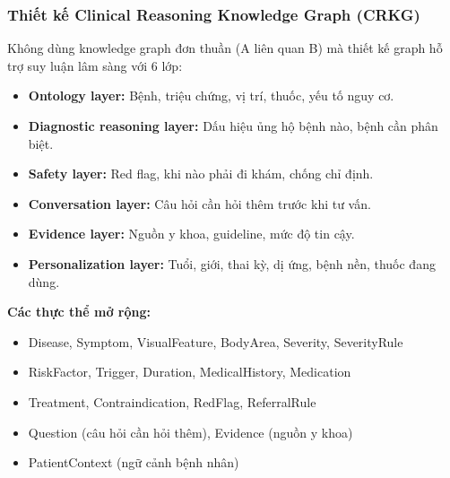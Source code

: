 \documentclass[12pt,a4paper]{article}
\begin{document}
\subsubsection{Thiết kế Clinical Reasoning Knowledge Graph (CRKG)}

Không dùng knowledge graph đơn thuần (A liên quan B) mà thiết kế graph hỗ trợ suy luận lâm sàng với 6 lớp:

\begin{itemize}
    \item \textbf{Ontology layer:} Bệnh, triệu chứng, vị trí, thuốc, yếu tố nguy cơ.
    \item \textbf{Diagnostic reasoning layer:} Dấu hiệu ủng hộ bệnh nào, bệnh cần phân biệt.
    \item \textbf{Safety layer:} Red flag, khi nào phải đi khám, chống chỉ định.
    \item \textbf{Conversation layer:} Câu hỏi cần hỏi thêm trước khi tư vấn.
    \item \textbf{Evidence layer:} Nguồn y khoa, guideline, mức độ tin cậy.
    \item \textbf{Personalization layer:} Tuổi, giới, thai kỳ, dị ứng, bệnh nền, thuốc đang dùng.
\end{itemize}

\textbf{Các thực thể mở rộng:}
\begin{itemize}
    \item Disease, Symptom, VisualFeature, BodyArea, Severity, SeverityRule
    \item RiskFactor, Trigger, Duration, MedicalHistory, Medication
    \item Treatment, Contraindication, RedFlag, ReferralRule
    \item Question (câu hỏi cần hỏi thêm), Evidence (nguồn y khoa)
    \item PatientContext (ngữ cảnh bệnh nhân)
\end{itemize}
\end{document}
